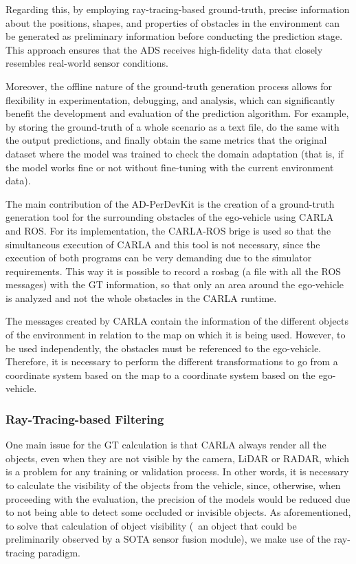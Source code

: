 Regarding this, by employing ray-tracing-based ground-truth, precise information about the positions, shapes, and properties of obstacles in the environment can be generated as preliminary information before conducting the prediction stage. This approach ensures that the \ac{ADS} receives high-fidelity data that closely resembles real-world sensor conditions. 

Moreover, the offline nature of the ground-truth generation process allows for flexibility in experimentation, debugging, and analysis, which can significantly benefit the development and evaluation of the prediction algorithm. For example, by storing the ground-truth of a whole scenario as a text file, do the same with the output predictions, and finally obtain the same metrics that the original dataset where the model was trained to check the domain adaptation (that is, if the model works fine or not without fine-tuning with the current environment data).

The main contribution of the \ac{AD-PerDevKit} is the creation of a ground-truth generation tool for the surrounding obstacles of the ego-vehicle using \ac{CARLA} and \ac{ROS}. For its implementation, the \ac{CARLA}-\ac{ROS} brige is used so that the simultaneous execution of \ac{CARLA} and this tool is not necessary, since the execution of both programs can be very demanding due to the simulator requirements. This way it is possible to record a rosbag (a file with all the \ac{ROS} messages) with the \ac{GT} information, so that only an area around the ego-vehicle is analyzed and not the whole obstacles in the \ac{CARLA} runtime.

The messages created by \ac{CARLA} contain the information of the different objects of the environment in relation to the map on which it is being used. However, to be used independently, the obstacles must be referenced to the ego-vehicle. Therefore, it is necessary to perform the different transformations to go from a coordinate system based on the map to a coordinate system based on the ego-vehicle.

\subsubsection{Ray-Tracing-based Filtering}
\label{subsubsec:8_ad_perdevkit_object_visibility}

One main issue for the \ac{GT} calculation is that \ac{CARLA} always render all the objects, even when they are not visible by the camera, \ac{LiDAR} or \ac{RADAR}, which is a problem for any training or validation process. In other words, it is necessary to calculate the visibility of the objects from the vehicle, since, otherwise, when proceeding with the evaluation, the precision of the models would be reduced due to not being able to detect some occluded or invisible objects. As aforementioned, to solve that calculation of object visibility (\ie \ an object that could be preliminarily observed by a \ac{SOTA} sensor fusion module), we make use of the ray-tracing paradigm.

